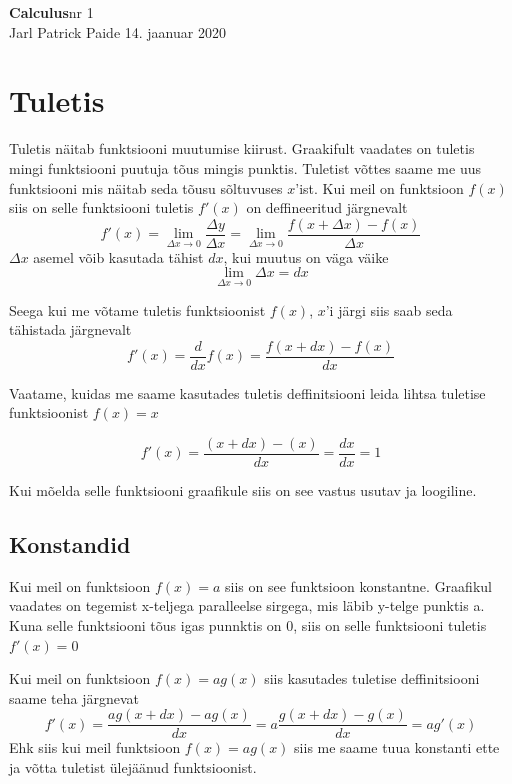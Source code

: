 \documentclass[a4paper,11pt,twocolumn]{article}
\begin{document}
{\huge \textbf{Calculus}\hfill \normalsize {nr 1}} \\
{Jarl Patrick Paide \hfill 14. jaanuar 2020}

\section{Tuletis}

Tuletis näitab funktsiooni muutumise kiirust. Graakifult vaadates on tuletis mingi funktsiooni puutuja tõus mingis punktis. Tuletist võttes saame me uus funktsiooni mis näitab seda tõusu sõltuvuses $x$'ist. Kui meil on funktsioon $f(x)$ siis on selle funktsiooni tuletis $f'(x)$ on deffineeritud järgnevalt
\begin{equation*}
f'(x) = \lim_{\Delta x \to 0} \frac{\Delta y}{\Delta x} = \lim_{\Delta x \to 0} \frac{f(x+\Delta x) - f(x)}{\Delta x}
\end{equation*}
$\Delta x$ asemel võib kasutada tähist $dx$, kui muutus on väga väike
\begin{equation*}
\lim_{\Delta x \to 0} \Delta x = dx
\end{equation*}

Seega kui me võtame tuletis funktsioonist $f(x)$, $x$'i järgi siis saab seda tähistada järgnevalt
\begin{equation*}
f'(x)=\frac{d}{dx}f(x) = \frac{f(x+ dx) - f(x)}{dx}
\end{equation*}

Vaatame, kuidas me saame kasutades tuletis deffinitsiooni leida lihtsa tuletise funktsioonist $f(x) = x$

\begin{equation*}
f'(x) = \frac{(x+dx) - (x)}{dx} = \frac{dx}{dx} = 1
\end{equation*}

Kui mõelda selle funktsiooni graafikule siis on see vastus usutav ja loogiline.

\subsection{Konstandid}
Kui meil on funktsioon $f(x) = a$ siis on see funktsioon konstantne. Graafikul vaadates on tegemist x-teljega paralleelse sirgega, mis läbib y-telge punktis a. Kuna selle funktsiooni tõus igas punnktis on 0, siis on selle funktsiooni tuletis $f'(x) = 0$

Kui meil on funktsioon $f(x) = ag(x)$ siis kasutades tuletise deffinitsiooni saame teha järgnevat
\begin{equation*}
f'(x) = \frac{ag(x+dx)-ag(x)}{dx} = a\frac{g(x+dx)-g(x)}{dx}=ag'(x)
\end{equation*}
Ehk siis kui meil funktsioon $f(x) = ag(x)$ siis me saame tuua konstanti ette ja võtta tuletist ülejäänud funktsioonist.
\end{document}
